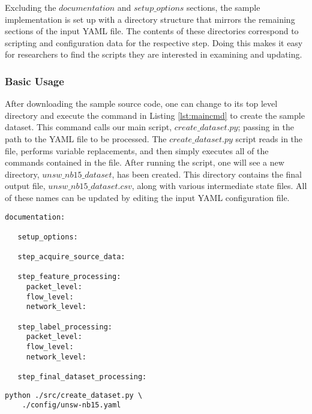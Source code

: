 \documentclass[sigconf]{acmart}
\begin{document}
Excluding the $documentation$ and $setup\_options$ sections, the sample implementation is set up with a directory structure that mirrors the remaining sections of the input YAML file.
The contents of these directories correspond to scripting and configuration data for the respective step.
Doing this makes it easy for researchers to find the scripts they are interested in examining and updating.

\subsubsection{Basic Usage}\label{subsubsec:basic_usage}
After downloading the sample source code, one can change to its top level directory and execute the command in Listing \ref{lst:maincmd} to create the sample dataset.
This command calls our main script, $create\_dataset.py$; passing in the path to the YAML file to be processed.
The $create\_dataset.py$ script reads in the file, performs variable replacements, and then simply executes all of the commands contained  in the file.
After running the script, one will see a new directory, $unsw\_nb15\_dataset$, has been created.
This directory contains the final output file, $unsw\_nb15\_dataset.csv$, along with various intermediate state files.
All of these names can be updated by editing the input YAML configuration file.

\noindent\begin{minipage}{\linewidth}
\begin{lstlisting}[aboveskip=10pt, label=lst:yamltemplate, caption={A template input file for our sample guidelines implementation.  Each section would be filled in with either information or explicit commands that get run to generate a feature set from network source data.}, captionpos=b, basicstyle=\footnotesize, backgroundcolor=\color{gray!10!white}, frame=stb]
   documentation:
   
   setup_options:
   
   step_acquire_source_data:
   
   step_feature_processing:
     packet_level:
     flow_level:
     network_level:
   
   step_label_processing:
     packet_level:
     flow_level:
     network_level:
   
   step_final_dataset_processing:
\end{lstlisting}
\end{minipage}


\begin{lstlisting}[label=lst:maincmd, caption={The command to run to execute the sample implementation of the guidelines.}, captionpos=b, basicstyle=\footnotesize, backgroundcolor=\color{gray!10!white}, frame=stb, breaklines=True]
python ./src/create_dataset.py \
    ./config/unsw-nb15.yaml
\end{lstlisting}
\end{document}
